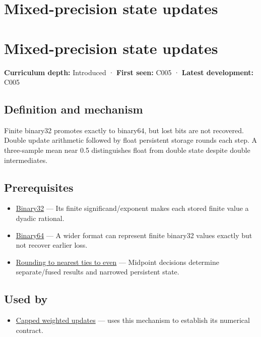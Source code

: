 \hypertarget{appendix-260182e617b7}{}
\section*{Mixed-precision state updates}
\section{Mixed-precision state updates}\label{mixed-precision-state-updates}

\textbf{Curriculum depth:} Introduced · \textbf{First seen:} C005 · \textbf{Latest development:} C005

\subsection{Definition and mechanism}\label{definition-and-mechanism}

Finite binary32 promotes exactly to binary64, but lost bits are not recovered. Double update arithmetic followed by float persistent storage rounds each step. A three-sample mean near 0.5 distinguishes float from double state despite double intermediates.

\subsection{Prerequisites}\label{prerequisites}

\begin{itemize}
\tightlist
\item
  \hyperref[appendix-5057f9ad327f]{Binary32} --- Its finite significand/exponent makes each stored finite value a dyadic rational.
\item
  \hyperref[appendix-5078dfab64e6]{Binary64} --- A wider format can represent finite binary32 values exactly but not recover earlier loss.
\item
  \hyperref[appendix-614afe1de592]{Rounding to nearest ties to even} --- Midpoint decisions determine separate/fused results and narrowed persistent state.
\end{itemize}

\subsection{Used by}\label{used-by}

\begin{itemize}
\tightlist
\item
  \hyperref[appendix-1e45d0613db3]{Capped weighted updates} --- uses this mechanism to establish its numerical contract.
\end{itemize}

